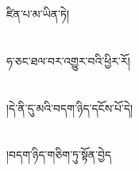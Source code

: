 ཛིན་པ་མ་ཡིན་ཏེ།\chapter{ }ཧ་ཅང་ཐལ་བར་འགྱུར་བའི་ཕྱིར་རོ།\chapter{ }།དེ་ནི་དུ་མའི་བདག་ཉིད་དངོས་པོ་དེ།\chapter{ }།བདག་ཉིད་གཅིག་ཏུ་སྟོན་བྱེད